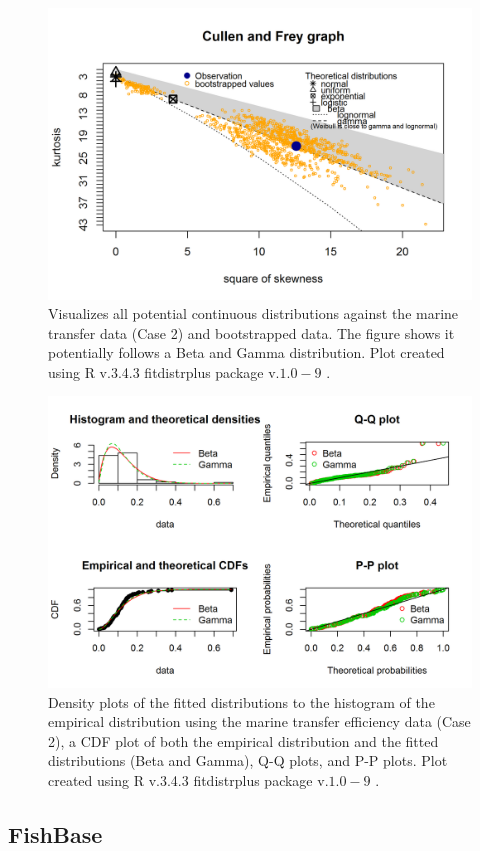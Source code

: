 \documentclass[oneside,12pt,final]{sty/ucthesis-CA2012}
\let\cite\citep                             %
\begin{document}
\begin{mainmatter}
\begin{figure}[H]
     \centering
       \includegraphics[width=.8\textwidth]{fig/cullen_frey_te}
    \caption{Visualizes all potential continuous distributions against the marine transfer data (Case 2) and bootstrapped data. The figure shows it potentially follows a Beta and Gamma distribution. Plot created using R v.3.4.3 \cite{Rcite} fitdistrplus package v.$1.0-9$ \cite{fitdistrplus}. }
    \label{cf_te_a3}
\end{figure}

\begin{figure}[H]
     \centering
       \includegraphics[width=.8\textwidth]{fig/gof_te}
    \caption{Density plots of the fitted distributions to the histogram of the empirical distribution using the marine transfer efficiency data (Case 2), a CDF plot of both the empirical distribution and the fitted distributions (Beta and Gamma), Q-Q plots, and P-P plots. Plot created using R v.3.4.3 \cite{Rcite} fitdistrplus package v.$1.0-9$ \cite{fitdistrplus}. }
    \label{gof_te_a3}
\end{figure}


\subsection{FishBase}

\end{mainmatter}
\end{document}
